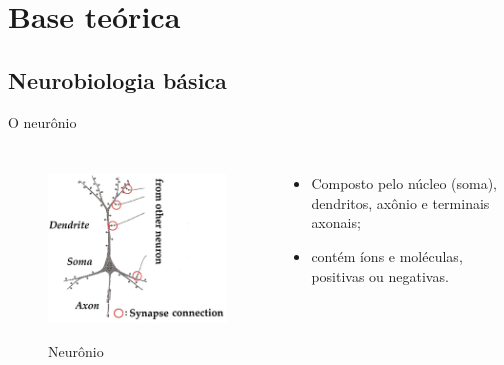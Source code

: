 \section{Base teórica}
\subsection*{Neurobiologia básica}
\begin{frame}{O neurônio}
	\begin{columns}[t]
		\column{5cm}
			\begin{figure}
				\centering
				\caption{Neurônio}
				\includegraphics[width=0.7\linewidth]{figs/neuronio}
				\label{fig:neuronio}
			\end{figure}
		\column{5cm}
			\begin{itemize}
				\item Composto pelo núcleo (soma), dendritos, axônio e terminais axonais;
				\item contém íons e moléculas, positivas ou negativas.
			\end{itemize}
	\end{columns}
\end{frame}

